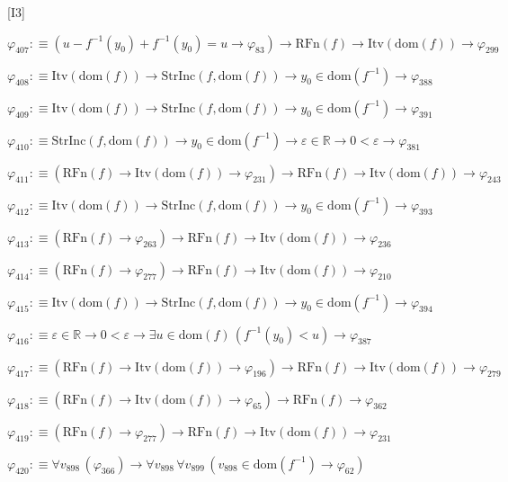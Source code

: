 \begin{fullproof}{[I3]}
\begin{abbrevlist}
\item $\varphi_{407} :\equiv (u - f^{-1}(y_{0}) + f^{-1}(y_{0}) = u \to \varphi_{83}) \to \mathrm{RFn}(f) \to \mathrm{Itv}(\mathrm{dom}(f)) \to \varphi_{299}$
\item $\varphi_{408} :\equiv \mathrm{Itv}(\mathrm{dom}(f)) \to \mathrm{StrInc}(f,\mathrm{dom}(f)) \to y_{0} \in \mathrm{dom}(f^{-1}) \to \varphi_{388}$
\item $\varphi_{409} :\equiv \mathrm{Itv}(\mathrm{dom}(f)) \to \mathrm{StrInc}(f,\mathrm{dom}(f)) \to y_{0} \in \mathrm{dom}(f^{-1}) \to \varphi_{391}$
\item $\varphi_{410} :\equiv \mathrm{StrInc}(f,\mathrm{dom}(f)) \to y_{0} \in \mathrm{dom}(f^{-1}) \to \varepsilon \in \mathbb{R} \to 0 < \varepsilon \to \varphi_{381}$
\item $\varphi_{411} :\equiv (\mathrm{RFn}(f) \to \mathrm{Itv}(\mathrm{dom}(f)) \to \varphi_{231}) \to \mathrm{RFn}(f) \to \mathrm{Itv}(\mathrm{dom}(f)) \to \varphi_{243}$
\item $\varphi_{412} :\equiv \mathrm{Itv}(\mathrm{dom}(f)) \to \mathrm{StrInc}(f,\mathrm{dom}(f)) \to y_{0} \in \mathrm{dom}(f^{-1}) \to \varphi_{393}$
\item $\varphi_{413} :\equiv (\mathrm{RFn}(f) \to \varphi_{263}) \to \mathrm{RFn}(f) \to \mathrm{Itv}(\mathrm{dom}(f)) \to \varphi_{236}$
\item $\varphi_{414} :\equiv (\mathrm{RFn}(f) \to \varphi_{277}) \to \mathrm{RFn}(f) \to \mathrm{Itv}(\mathrm{dom}(f)) \to \varphi_{210}$
\item $\varphi_{415} :\equiv \mathrm{Itv}(\mathrm{dom}(f)) \to \mathrm{StrInc}(f,\mathrm{dom}(f)) \to y_{0} \in \mathrm{dom}(f^{-1}) \to \varphi_{394}$
\item $\varphi_{416} :\equiv \varepsilon \in \mathbb{R} \to 0 < \varepsilon \to \exists u \in \mathrm{dom}(f)\,(f^{-1}(y_{0}) < u) \to \varphi_{387}$
\item $\varphi_{417} :\equiv (\mathrm{RFn}(f) \to \mathrm{Itv}(\mathrm{dom}(f)) \to \varphi_{196}) \to \mathrm{RFn}(f) \to \mathrm{Itv}(\mathrm{dom}(f)) \to \varphi_{279}$
\item $\varphi_{418} :\equiv (\mathrm{RFn}(f) \to \mathrm{Itv}(\mathrm{dom}(f)) \to \varphi_{65}) \to \mathrm{RFn}(f) \to \varphi_{362}$
\item $\varphi_{419} :\equiv (\mathrm{RFn}(f) \to \varphi_{277}) \to \mathrm{RFn}(f) \to \mathrm{Itv}(\mathrm{dom}(f)) \to \varphi_{231}$
\item $\varphi_{420} :\equiv \forall v_{898}\,(\varphi_{366}) \to \forall v_{898}\,\forall v_{899}\,(v_{898} \in \mathrm{dom}(f^{-1}) \to \varphi_{62})$

\end{abbrevlist}
\end{fullproof}
